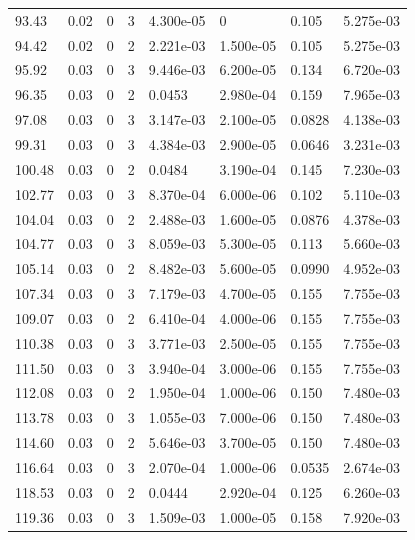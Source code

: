 \documentclass[preview]{standalone}
\begin{document}
{{{\begin{tabular}{L{1.2cm}C{1.2cm} C{0.3cm}C{0.5cm} C{1.4cm}C{1.4cm} C{1.4cm}C{1.4cm}}
  93.43  &  0.02  & 0     &  3 &  4.300e-05  & 0  & 0.105 &  5.275e-03   \\ 
  94.42  &  0.02  & 0     &  2 &  2.221e-03  & 1.500e-05  & 0.105 &  5.275e-03   \\ 
  95.92  &  0.03  & 0     &  3 &  9.446e-03  & 6.200e-05  & 0.134 &  6.720e-03   \\ 
  96.35  &  0.03  & 0     &  2 &  0.0453  & 2.980e-04  & 0.159 &  7.965e-03   \\ 
  97.08  &  0.03  & 0     &  3 &  3.147e-03  & 2.100e-05  & 0.0828 &  4.138e-03   \\ 
  99.31  &  0.03  & 0     &  3 &  4.384e-03  & 2.900e-05  & 0.0646 &  3.231e-03   \\ 
  100.48  &  0.03  & 0     &  2 &  0.0484  & 3.190e-04  & 0.145 &  7.230e-03   \\ 
  102.77  &  0.03  & 0     &  3 &  8.370e-04  & 6.000e-06  & 0.102 &  5.110e-03   \\ 
  104.04  &  0.03  & 0     &  2 &  2.488e-03  & 1.600e-05  & 0.0876 &  4.378e-03   \\ 
  104.77  &  0.03  & 0     &  3 &  8.059e-03  & 5.300e-05  & 0.113 &  5.660e-03   \\ 
  105.14  &  0.03  & 0     &  2 &  8.482e-03  & 5.600e-05  & 0.0990 &  4.952e-03   \\ 
  107.34  &  0.03  & 0     &  3 &  7.179e-03  & 4.700e-05  & 0.155 &  7.755e-03   \\ 
  109.07  &  0.03  & 0     &  2 &  6.410e-04  & 4.000e-06  & 0.155 &  7.755e-03   \\ 
  110.38  &  0.03  & 0     &  3 &  3.771e-03  & 2.500e-05  & 0.155 &  7.755e-03   \\ 
  111.50  &  0.03  & 0     &  3 &  3.940e-04  & 3.000e-06  & 0.155 &  7.755e-03   \\ 
  112.08  &  0.03  & 0     &  2 &  1.950e-04  & 1.000e-06  & 0.150 &  7.480e-03   \\ 
  113.78  &  0.03  & 0     &  3 &  1.055e-03  & 7.000e-06  & 0.150 &  7.480e-03   \\ 
  114.60  &  0.03  & 0     &  2 &  5.646e-03  & 3.700e-05  & 0.150 &  7.480e-03   \\ 
  116.64  &  0.03  & 0     &  3 &  2.070e-04  & 1.000e-06  & 0.0535 &  2.674e-03   \\ 
  118.53  &  0.03  & 0     &  2 &  0.0444  & 2.920e-04  & 0.125 &  6.260e-03   \\ 
  119.36  &  0.03  & 0     &  3 &  1.509e-03  & 1.000e-05  & 0.158 &  7.920e-03   \\ 

\end{tabular}}}}
\end{document}
